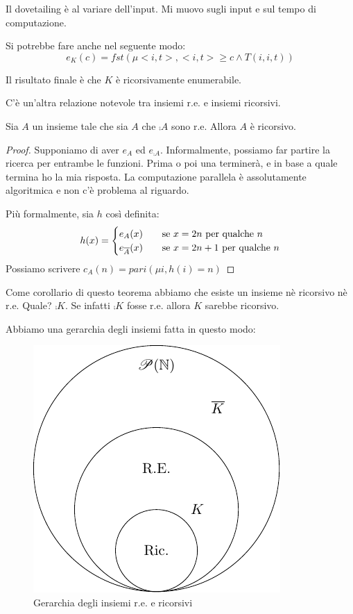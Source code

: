 Il dovetailing è al variare dell'input. Mi muovo sugli input e sul tempo di computazione.

Si potrebbe fare anche nel seguente modo:
\begin{equation*}
    e_{K}(c) = fst(\mu <i,t>, <i,t> \geq c \land T(i,i,t))
\end{equation*}

Il risultato finale è che $K$ è ricorsivamente enumerabile.

C'è un'altra relazione notevole tra insiemi r.e. e insiemi ricorsivi.

\begin{thm}
    Sia $A$ un insieme tale che sia $A$ che $\comp{A}$ sono r.e. Allora $A$ è ricorsivo.
\end{thm}
\begin{proof}
    Supponiamo di aver $e_{A}$ ed $e_{\comp{A}}$. Informalmente, possiamo far partire la ricerca per
    entrambe le funzioni. Prima o poi una terminerà, e in base a quale termina ho la mia risposta. La
    computazione parallela è assolutamente algoritmica e non c'è problema al riguardo.

    Più formalmente, sia $h$ così definita:
    \begin{equation*}
        h(x) =
        \begin{cases}
            e_{A}(x) \quad &\text{se $x = 2n$ per qualche $n$} \\
            e_{\overline{A}}(x) \quad &\text{se $x = 2n+1$ per qualche $n$} \\
        \end{cases}
    \end{equation*}
    Possiamo scrivere $c_{A}(n) = \textit{pari}(\mu i, h(i) = n)$
\end{proof}

Come corollario di questo teorema abbiamo che esiste un insieme nè ricorsivo nè r.e. Quale?
$\comp{K}$. Se infatti $\comp{K}$ fosse r.e. allora $K$ sarebbe ricorsivo.

Abbiamo una gerarchia degli insiemi fatta in questo modo: 

\begin{figure}[h]
    \centering
    \includegraphics{img/RecursiveHierarchy.pdf}
    \caption{Gerarchia degli insiemi r.e. e ricorsivi}
\end{figure}

